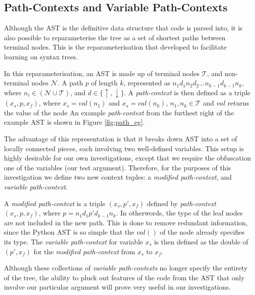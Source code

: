 \subsection{Path-Contexts and Variable Path-Contexts} %
\label{sub:abstract_syntax_trees}

Although the AST is the definitive data structure that code is parsed into, it is also possible to reparameterise the tree as a set of shortest paths between terminal nodes. 
This is the reparameterisation that \citet{alon_general_2018} developed to facilitate learning on syntax trees.

In this reparameterisation, an AST is made up of terminal nodes $\mathcal{T}$, and non-terminal nodes $\mathcal{N}$. 
A path $p$ of length $k$, represented as $n_{1}d_{1}n_{2}d_{2}...n_{k-1}d_{k-1}n_{k}$, where $n_i \in (\mathcal{N} \cup \mathcal{T})$, and $d \in \{\uparrow, \downarrow\}$. 
A \textit{path-context} is then defined as a triple $(x_s, p, x_f)$, where $x_s = val(n_1) $ and $x_s = val(n_k)$, $n_1,n_k \in \mathcal{T}$ and $val$ returns the value of the node \citep{alon_general_2018} 
An example \textit{path-context} from the furthest right of the example AST is shown in Figure \ref{fig:path_eg}.

The advantage of this representation is that it breaks down AST into a set of locally connected pieces, each involving two well-defined variables.
This setup is highly desirable for our own investigations, except that we require the obfuscation one of the variables (our test argument).
Therefore, for the purposes of this investigation we define two new context tuples: a \textit{modified path-context}, and \textit{variable path-context}.

A \textit{modified path-context} is a triple $(x_s, p', x_f)$ defined by \textit{path-context} $(x_s, p, x_f)$, where $p = n_{1}d_{1}p'd_{k-1}n_{k}$. In otherwords, the type of the leaf nodes are not included in the new path. This is done to remove redundant information, since the Python AST is so simple that the $val( )$ of the node already specifies its type.
The \textit{variable path-context} for variable $x_s$ is then defined as the double of $(p', x_f)$ for the \textit{modified path-context} from $x_s$ to $x_f$.

Although these collections of \textit{variable path-contexts} no longer specify the entirety of the tree, the ability to pluck out features of the code from the AST that only involve our particular argument will prove very useful in our investigations. 





